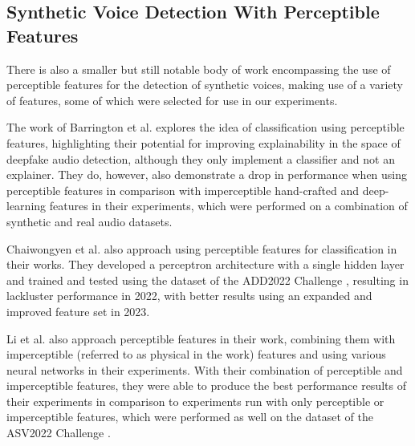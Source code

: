 \documentclass{article}
\begin{document}
	\subsection{Synthetic Voice Detection With Perceptible Features}
	There is also a smaller but still notable body of work encompassing the use of perceptible
	features for the detection of synthetic voices, making use of a variety of features, some of
	which were selected for use in our experiments.
	\par
	The work of Barrington et al. \cite{barrington_single_2023} explores the idea of
	classification using perceptible features, highlighting their potential for improving
	explainability in the space of deepfake audio detection, although they only implement a
	classifier and not an explainer. They do, however, also demonstrate a drop in performance when
	using perceptible features in comparison with imperceptible hand-crafted and deep-learning
	features in their experiments, which were performed on a combination of synthetic and real
	audio datasets.
	\par
	Chaiwongyen et al. \cite{chaiwongyen_contribution_2022,chaiwongyen_deepfake-speech_2023} also
	approach using perceptible features for classification in their works. They developed a
	perceptron architecture with a single hidden layer and trained and tested using the dataset
	of the ADD2022 Challenge \cite{yi_add_2024}, resulting in lackluster performance in 2022, with
	better results using an expanded and improved feature set in 2023.
	\par
	Li et al. \cite{li_comparative_2022} also approach perceptible features in their work,
	combining them with imperceptible (referred to as physical in the work) features and using
	various neural networks in their experiments. With their combination of perceptible and
	imperceptible features, they were able to produce the best performance results of their
	experiments in comparison to experiments run with only perceptible or imperceptible features,
	which were performed as well on the dataset of the ASV2022 Challenge \cite{yi_add_2024}.
\end{document}

